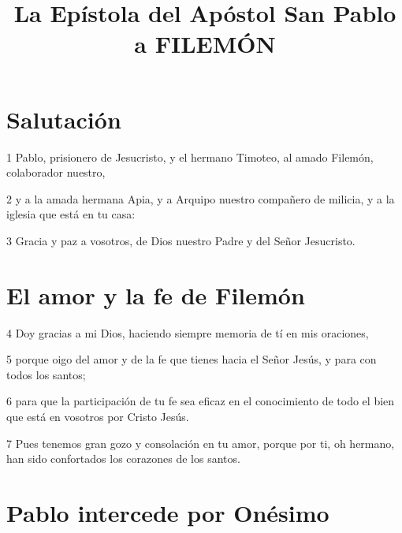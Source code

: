 
\title{La Epístola del Apóstol San Pablo a FILEMÓN}

\section*{Salutación}

\par 1 Pablo, prisionero de Jesucristo, y el hermano Timoteo, al amado Filemón, colaborador nuestro,
\par 2 y a la amada hermana Apia, y a Arquipo nuestro compañero de milicia, y a la iglesia que está en tu casa:
\par 3 Gracia y paz a vosotros, de Dios nuestro Padre y del Señor Jesucristo.

\section*{El amor y la fe de Filemón}

\par 4 Doy gracias a mi Dios, haciendo siempre memoria de tí en mis oraciones,
\par 5 porque oigo del amor y de la fe que tienes hacia el Señor Jesús, y para con todos los santos;
\par 6 para que la participación de tu fe sea eficaz en el conocimiento de todo el bien que está en vosotros por Cristo Jesús.
\par 7 Pues tenemos gran gozo y consolación en tu amor, porque por ti, oh hermano, han sido confortados los corazones de los santos.

\section*{Pablo intercede por Onésimo}

